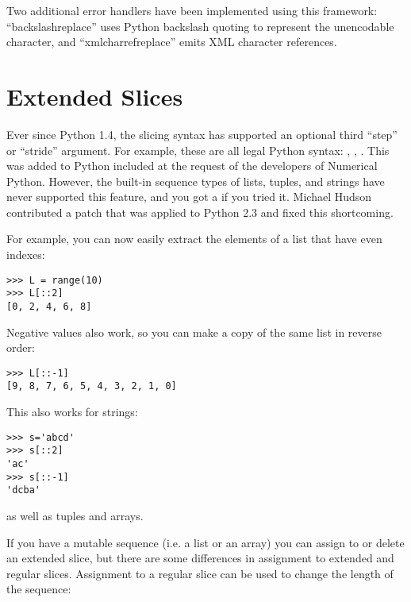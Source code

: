 \documentclass{howto}
\begin{document}
Two additional error handlers have been implemented using this
framework: ``backslashreplace'' uses Python backslash quoting to
represent the unencodable character, and ``xmlcharrefreplace'' emits
XML character references.

\begin{seealso}


\end{seealso}


\section{Extended Slices\label{section-slices}}

Ever since Python 1.4, the slicing syntax has supported an optional
third ``step'' or ``stride'' argument.  For example, these are all
legal Python syntax: , ,
.  This was added to Python included at the request of
the developers of Numerical Python.  However, the built-in sequence
types of lists, tuples, and strings have never supported this feature,
and you got a  if you tried it.  Michael Hudson
contributed a patch that was applied to Python 2.3 and fixed this 
shortcoming.

For example, you can now easily extract the elements of a list that
have even indexes:

\begin{verbatim}
>>> L = range(10)
>>> L[::2]
[0, 2, 4, 6, 8]
\end{verbatim}

Negative values also work, so you can make a copy of the same list in
reverse order:

\begin{verbatim}
>>> L[::-1]
[9, 8, 7, 6, 5, 4, 3, 2, 1, 0]
\end{verbatim}

This also works for strings:

\begin{verbatim}
>>> s='abcd'
>>> s[::2]
'ac'
>>> s[::-1]
'dcba'
\end{verbatim}

as well as tuples and arrays.

If you have a mutable sequence (i.e. a list or an array) you can
assign to or delete an extended slice, but there are some differences
in assignment to extended and regular slices.  Assignment to a regular
slice can be used to change the length of the sequence:
\end{document}
